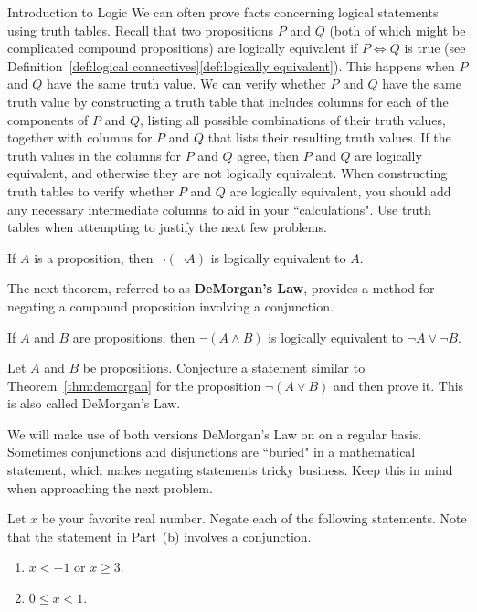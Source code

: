 \begin{section}{Introduction to Logic}
We can often prove facts concerning logical statements using truth tables.  Recall that two propositions $P$ and $Q$ (both of which might be complicated compound propositions) are logically equivalent if $P\iff Q$ is true (see Definition~\ref{def:logical connectives}\ref{def:logically equivalent}). This happens when $P$ and $Q$ have the same truth value. We can verify whether $P$ and $Q$ have the same truth value by constructing a truth table that includes columns for each of the components of $P$ and $Q$, listing all possible combinations of their truth values, together with columns for $P$ and $Q$ that lists their resulting truth values.  If the truth values in the columns for $P$ and $Q$ agree, then $P$ and $Q$ are logically equivalent, and otherwise they are not logically equivalent.  When constructing truth tables to verify whether $P$ and $Q$ are logically equivalent, you should add any necessary intermediate columns to aid in your ``calculations". Use truth tables when attempting to justify the next few problems.

\begin{theorem}
If $A$ is a proposition, then $\neg(\neg A)$ is logically equivalent to $A$.
\end{theorem}

The next theorem, referred to as \textbf{DeMorgan's Law}, provides a method for negating a compound proposition involving a conjunction.

\begin{theorem}\label{thm:demorgan}
If $A$ and $B$ are propositions, then $\neg(A \wedge B)$ is logically equivalent to $\neg A \vee \neg B$.
\end{theorem}

\begin{problem}\label{prob:demorgan}
Let $A$ and $B$ be propositions.  Conjecture a statement similar to Theorem~\ref{thm:demorgan} for the proposition $\neg(A\vee B)$ and then prove it. This is also called DeMorgan's Law.
\end{problem}

We will make use of both versions DeMorgan's Law on on a regular basis. Sometimes conjunctions and disjunctions are ``buried" in a mathematical statement, which makes negating statements tricky business. Keep this in mind when approaching the next problem.

\begin{problem}\label{prob:negation}
Let $x$ be your favorite real number.  Negate each of the following statements.  Note that the statement in Part~(b) involves a conjunction.
\begin{enumerate}[label=\textrm{(\alph*)}]
\item $x<-1$ or $x\geq 3$.
\item $0\leq x< 1$.
\end{enumerate}
\end{problem}


\end{section}
